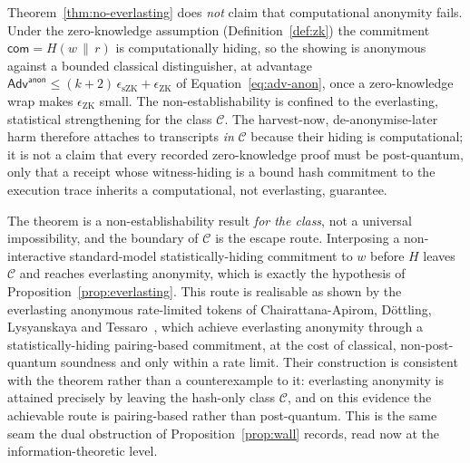 \begin{remark}\label{rem:thaler-boundary}
    Theorem~\ref{thm:no-everlasting} does \emph{not} claim that computational anonymity fails. Under the zero-knowledge assumption (Definition~\ref{def:zk}) the commitment $\mathsf{com}=H(w\,\|\,r)$ is computationally hiding, so the showing is anonymous against a bounded classical distinguisher, at advantage $\mathsf{Adv}^{\mathsf{anon}}\le(k+2)\,\epsilon_{\mathrm{sZK}}+\epsilon_{\mathrm{ZK}}$ of Equation~\eqref{eq:adv-anon}, once a zero-knowledge wrap makes $\epsilon_{\mathrm{ZK}}$ small. The non-establishability is confined to the everlasting, statistical strengthening for the class $\mathcal C$. The harvest-now, de-anonymise-later harm therefore attaches to transcripts \emph{in} $\mathcal C$ because their hiding is computational; it is not a claim that every recorded zero-knowledge proof must be post-quantum, only that a receipt whose witness-hiding is a bound hash commitment to the execution trace inherits a computational, not everlasting, guarantee.
    
    The theorem is a non-establishability result \emph{for the class}, not a universal impossibility, and the boundary of $\mathcal C$ is the escape route. Interposing a non-interactive standard-model statistically-hiding commitment to $w$ before $H$ leaves $\mathcal C$ and reaches everlasting anonymity, which is exactly the hypothesis of Proposition~\ref{prop:everlasting}. This route is realisable as shown by the everlasting anonymous rate-limited tokens of Chairattana-Apirom, D\"ottling, Lysyanskaya and Tessaro~\cite{cryptoeprint:2025/1030}, which achieve everlasting anonymity through a statistically-hiding pairing-based commitment, at the cost of classical, non-post-quantum soundness and only within a rate limit. Their construction is consistent with the theorem rather than a counterexample to it: everlasting anonymity is attained precisely by leaving the hash-only class $\mathcal C$, and on this evidence the achievable route is pairing-based rather than post-quantum. This is the same seam the dual obstruction of Proposition~\ref{prop:wall} records, read now at the information-theoretic level.
\end{remark}

